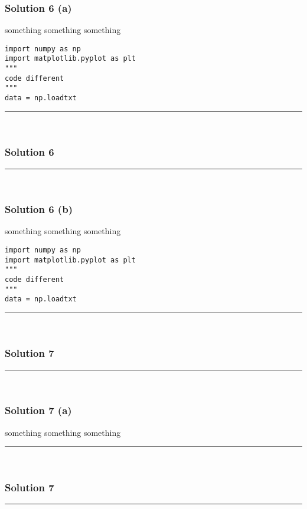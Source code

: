 \documentclass{article}
\begin{document}
\subsubsection*{Solution 6 (a)}
\parbox{\textwidth}{
something something something
}
\begin{lstlisting}
import numpy as np
import matplotlib.pyplot as plt
"""
code different
"""
data = np.loadtxt
\end{lstlisting}

\noindent\rule{\textwidth}{0.4pt}\\

\newpage

\subsubsection*{Solution 6}
\noindent\rule{\textwidth}{0.4pt}\\
\subsubsection*{Solution 6 (b)}
\parbox{\textwidth}{
something something something
}
\begin{lstlisting}
import numpy as np
import matplotlib.pyplot as plt
"""
code different
"""
data = np.loadtxt
\end{lstlisting}

\noindent\rule{\textwidth}{0.4pt}\\

\newpage

\subsubsection*{Solution 7}
\noindent\rule{\textwidth}{0.4pt}\\
\subsubsection*{Solution 7 (a)}
\parbox{\textwidth}{
something something something
}
\noindent\rule{\textwidth}{0.4pt}\\

\newpage

\subsubsection*{Solution 7}
\noindent\rule{\textwidth}{0.4pt}\\
\end{document}

